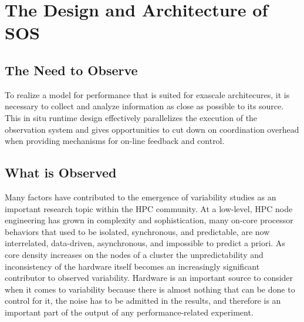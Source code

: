
\section{The Design and Architecture of SOS}

\subsection{The Need to Observe}
To realize a model for performance that is suited for exascale
architecures, it is necessary to collect and analyze information as
close as possible to its source. This in situ runtime design
effectively parallelizes the execution of the observation
system and gives opportunities to cut down on coordination
overhead when providing mechanisms for on-line feedback and control.


\subsection{What is Observed}
Many factors have contributed to the emergence of variability studies
as an important research topic within the HPC community. At a
low-level, HPC node engineering has grown in complexity and
sophistication, many on-core processor behaviors that used to be
isolated, synchronous, and predictable, are now interrelated,
data-driven, asynchronous, and impossible to predict a priori. As core
density increases on the nodes of a cluster the unpredictability and
inconsistency of the hardware itself becomes an increasingly
significant contributor to observed variability. Hardware is an
important source to consider when it comes to variability because
there is almost nothing that can be done to control for it, the noise
has to be admitted in the results, and therefore is an important part
of the output of any performance-related experiment.

